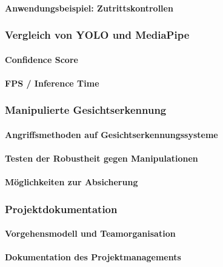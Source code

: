 \paragraph{Anwendungsbeispiel: Zutrittskontrollen}

\subsubsection{Vergleich von YOLO und MediaPipe}
\paragraph{Confidence Score}
\paragraph{FPS / Inference Time}

\subsubsection{Manipulierte Gesichtserkennung}
\paragraph{Angriffsmethoden auf Gesichtserkennungssysteme}
\paragraph{Testen der Robustheit gegen Manipulationen}
\paragraph{Möglichkeiten zur Absicherung}

\subsubsection{Projektdokumentation}
\paragraph{Vorgehensmodell und Teamorganisation}
\paragraph{Dokumentation des Projektmanagements}